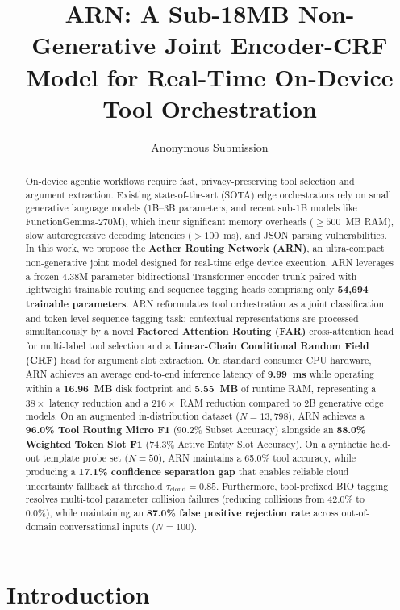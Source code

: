\documentclass[letterpaper]{article} %
\title{ARN: A Sub-18MB Non-Generative Joint Encoder-CRF Model for Real-Time On-Device Tool Orchestration}
\author{
    Anonymous Submission
}
\begin{document}
\maketitle

\begin{abstract}
On-device agentic workflows require fast, privacy-preserving tool selection and argument extraction. Existing state-of-the-art (SOTA) edge orchestrators rely on small generative language models (1B--3B parameters, and recent sub-1B models like FunctionGemma-270M), which incur significant memory overheads ($\ge 500$~MB RAM), slow autoregressive decoding latencies ($>100$~ms), and JSON parsing vulnerabilities. In this work, we propose the \textbf{Aether Routing Network (ARN)}, an ultra-compact non-generative joint model designed for real-time edge device execution. ARN leverages a frozen 4.38M-parameter bidirectional Transformer encoder trunk paired with lightweight trainable routing and sequence tagging heads comprising only \textbf{54,694 trainable parameters}. ARN reformulates tool orchestration as a joint classification and token-level sequence tagging task: contextual representations are processed simultaneously by a novel \textbf{Factored Attention Routing (FAR)} cross-attention head for multi-label tool selection and a \textbf{Linear-Chain Conditional Random Field (CRF)} head for argument slot extraction. On standard consumer CPU hardware, ARN achieves an average end-to-end inference latency of \textbf{9.99~ms} while operating within a \textbf{16.96~MB} disk footprint and \textbf{5.55~MB} of runtime RAM, representing a $38\times$ latency reduction and a $216\times$ RAM reduction compared to 2B generative edge models. On an augmented in-distribution dataset ($N=13,798$), ARN achieves a \textbf{96.0\% Tool Routing Micro F1} (90.2\% Subset Accuracy) alongside an \textbf{88.0\% Weighted Token Slot F1} (74.3\% Active Entity Slot Accuracy). On a synthetic held-out template probe set ($N=50$), ARN maintains a 65.0\% tool accuracy, while producing a \textbf{17.1\% confidence separation gap} that enables reliable cloud uncertainty fallback at threshold $\tau_{\text{cloud}} = 0.85$. Furthermore, tool-prefixed BIO tagging resolves multi-tool parameter collision failures (reducing collisions from 42.0\% to 0.0\%), while maintaining an \textbf{87.0\% false positive rejection rate} across out-of-domain conversational inputs ($N=100$).
\end{abstract}

\section{Introduction}
\end{document}
